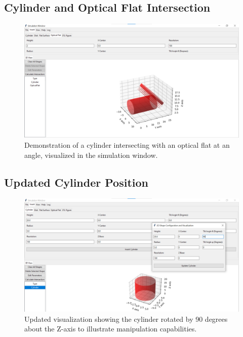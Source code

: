 \documentclass[../main.tex]{subfiles}
\begin{document}
\subsection{Cylinder and Optical Flat Intersection}
\begin{figure}[H]
\centering
\includegraphics[width=\textwidth]{Images/Appendix/simulation/cylinder_optical_flatr}
\caption{Demonstration of a cylinder intersecting with an optical flat at an angle, visualized in the simulation window.}
\end{figure}

\subsection{Updated Cylinder Position}
\begin{figure}[H]
\centering
\includegraphics[width=\textwidth]{Images/Appendix/simulation/cylinder_update}
\caption{Updated visualization showing the cylinder rotated by 90 degrees about the Z-axis to illustrate manipulation capabilities.}
\end{figure}
\end{document}

